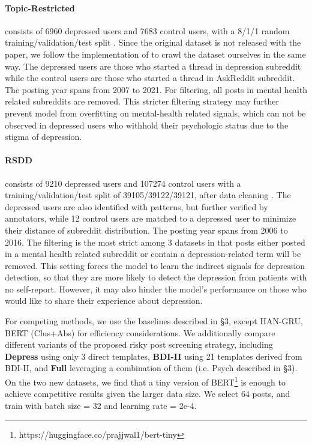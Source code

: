 \documentclass{article}
\begin{document}
\paragraph{Topic-Restricted} consists of 6960 depressed users and 7683 control users, with a 8/1/1 random training/validation/test split \cite{wolohan2018detecting}. Since the original dataset is not released with the paper, we follow the implementation of \cite{harrigian2020models} to crawl the dataset ourselves in the same way. The depressed users are those who started a thread in depression subreddit while the control users are those who started a thread in AskReddit subreddit. The posting year spans from 2007 to 2021. For filtering, all posts in mental health related subreddits are removed. This stricter filtering strategy may further prevent model from overfitting on mental-health related signals, which can not be observed in depressed users who withhold their psychologic status due to the stigma of depression. 

\paragraph{RSDD} consists of 9210 depressed users and 107274 control users with a training/validation/test split of 39105/39122/39121, after data cleaning \cite{yates2017depression}. The depressed users are also identified with patterns, but further verified by annotators, while 12 control users are matched to a depressed user to minimize their distance of subreddit distribution. The posting year spans from 2006 to 2016. The filtering is the most strict among 3 datasets in that posts either posted in a mental health related subreddit or contain a depression-related term will be removed. This setting forces the model to learn the indirect signals for depression detection, so that they are more likely to detect the depression from patients with no self-report. However, it may also hinder the model's performance on those who would like to share their experience about depression.

For competing methods, we use the baselines described in \S 3, except HAN-GRU, BERT (Clus+Abs) for efficiency considerations. We additionally compare different variants of the proposed risky post screening strategy, including \textbf{Depress} using only 3 direct templates, \textbf{BDI-II} using 21 templates derived from BDI-II, and \textbf{Full} leveraging a combination of them (i.e. Psych described in \S 3). On the two new datasets, we find that a tiny version of BERT\footnote{https://huggingface.co/prajjwal1/bert-tiny} is enough to achieve competitive results given the larger data size. We select 64 posts, and train with batch size = 32 and learning rate = 2e-4. 
\end{document}
